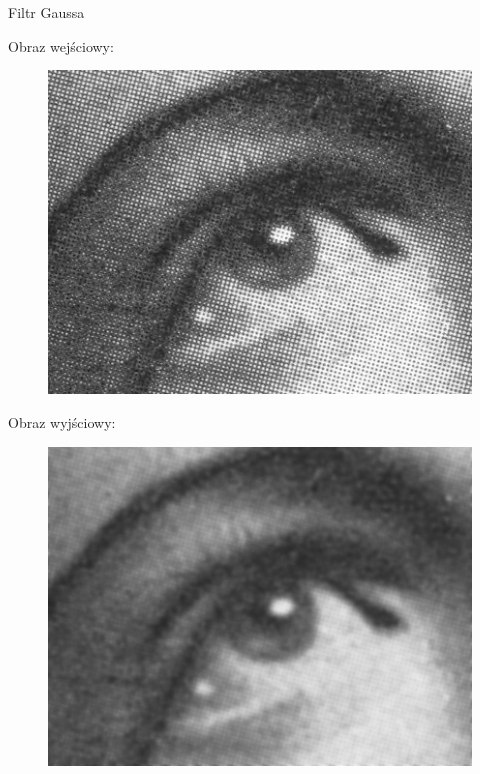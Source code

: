 \documentclass[xcolor=dvipsnames]{beamer}
\begin{document}
\begin{frame}{Filtr Gaussa}
    \begin{minipage}[t]{0.48\linewidth}
        Obraz wejściowy:
        \begin{figure}
            \includegraphics[width=\textwidth]{img/gauss-conv-real-input.jpg}
        \end{figure}
	\end{minipage}%
	\hfill
	\begin{minipage}[t]{0.48\linewidth}
        Obraz wyjściowy:
        \begin{figure}
            \includegraphics[width=\textwidth]{img/gauss-conv-real-output.jpg}
        \end{figure}
	\end{minipage}
\end{frame}
\end{document}
